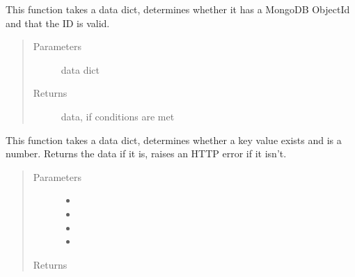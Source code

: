 \documentclass[letterpaper,10pt,english]{sphinxmanual}
\begin{document}
\begin{fulllineitems}
\label{\detokenize{apidoc/utdesign_procurement:utdesign_procurement.utils.checkValidID}}
This function takes a data dict, determines whether it has a MongoDB
ObjectId and that the ID is valid.
\begin{quote}\begin{description}
\item[{Parameters}] \leavevmode
{} \textendash{} data dict

\item[{Returns}] \leavevmode
data, if conditions are met

\end{description}\end{quote}

\end{fulllineitems}


\begin{fulllineitems}
\label{\detokenize{apidoc/utdesign_procurement:utdesign_procurement.utils.checkValidNumber}}
This function takes a data dict, determines whether a key value exists
and is a number. Returns the data if it is, raises an
HTTP error if it isn’t.
\begin{quote}\begin{description}
\item[{Parameters}] \leavevmode\begin{itemize}
\item {} 
 \textendash{} 

\item {} 
 \textendash{} 

\item {} 
 \textendash{} 

\item {} 
 \textendash{} 

\end{itemize}

\item[{Returns}] \leavevmode


\end{description}\end{quote}

\end{fulllineitems}
\end{document}
